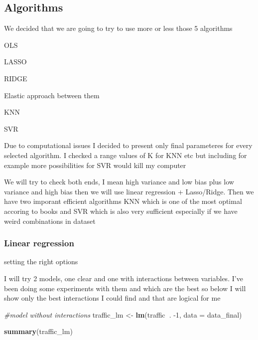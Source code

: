 \documentclass[
]{article}
\newenvironment{Shaded}{\begin{snugshade}}{\end{snugshade}}
\newcommand{\CommentTok}[1]{\textcolor[rgb]{0.56,0.35,0.01}{\textit{#1}}}
\newcommand{\DataTypeTok}[1]{\textcolor[rgb]{0.13,0.29,0.53}{#1}}
\newcommand{\DecValTok}[1]{\textcolor[rgb]{0.00,0.00,0.81}{#1}}
\newcommand{\KeywordTok}[1]{\textcolor[rgb]{0.13,0.29,0.53}{\textbf{#1}}}
\newcommand{\NormalTok}[1]{#1}
\newcommand{\OperatorTok}[1]{\textcolor[rgb]{0.81,0.36,0.00}{\textbf{#1}}}
\newcommand{\StringTok}[1]{\textcolor[rgb]{0.31,0.60,0.02}{#1}}
\begin{document}
\hypertarget{algorithms}{%
\subsection{Algorithms}\label{algorithms}}

We decided that we are going to try to use more or less those 5
algorithms

OLS

LASSO

RIDGE

Elastic approach between them

KNN

SVR

Due to computational issues I decided to present only final parameteres
for every selected algorithm. I checked a range values of K for KNN etc
but including for example more possibilities for SVR would kill my
computer

We will try to check both ends, I mean high variance and low bias plus
low variance and high bias then we will use linear regression +
Lasso/Ridge. Then we have two imporant efficient algorithms KNN which is
one of the most optimal accoring to books and SVR which is also very
sufficient especially if we have weird combinations in dataset

\hypertarget{linear-regression}{%
\subsubsection{Linear regression}\label{linear-regression}}

setting the right options

I will try 2 models, one clear and one with interactions between
variables. I've been doing some experiments with them and which are the
best so below I will show only the best interactions I could find and
that are logical for me

\begin{Shaded}
\begin{Highlighting}[]
\CommentTok{#model without interactions}
\NormalTok{traffic_lm <-}\StringTok{ }\KeywordTok{lm}\NormalTok{(traffic}\OperatorTok{~}\NormalTok{. }\DecValTok{-1}\NormalTok{, }
                 \DataTypeTok{data =}\NormalTok{ data_final) }

\KeywordTok{summary}\NormalTok{(traffic_lm)}
\end{Highlighting}
\end{Shaded}
\end{document}
